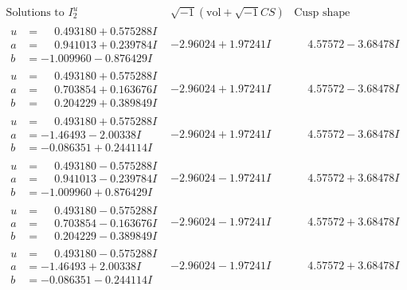 \documentclass[1p]{elsarticle_modified}
\theoremstyle{definition}
\newcommand{\I}{\sqrt{-1}}
\begin{document}
$$\begin{array}{c|c|c}  
\text{Solutions to }I^u_{2}& \I (\text{vol} + \sqrt{-1}CS) & \text{Cusp shape}\\
 \hline 
\begin{aligned}
u &= \phantom{-}0.493180 + 0.575288 I \\
a &= \phantom{-}0.941013 + 0.239784 I \\
b &= -1.009960 - 0.876429 I\end{aligned}
 & -2.96024 + 1.97241 I & \phantom{-}4.57572 - 3.68478 I \\ \hline\begin{aligned}
u &= \phantom{-}0.493180 + 0.575288 I \\
a &= \phantom{-}0.703854 + 0.163676 I \\
b &= \phantom{-}0.204229 + 0.389849 I\end{aligned}
 & -2.96024 + 1.97241 I & \phantom{-}4.57572 - 3.68478 I \\ \hline\begin{aligned}
u &= \phantom{-}0.493180 + 0.575288 I \\
a &= -1.46493 - 2.00338 I \\
b &= -0.086351 + 0.244114 I\end{aligned}
 & -2.96024 + 1.97241 I & \phantom{-}4.57572 - 3.68478 I \\ \hline\begin{aligned}
u &= \phantom{-}0.493180 - 0.575288 I \\
a &= \phantom{-}0.941013 - 0.239784 I \\
b &= -1.009960 + 0.876429 I\end{aligned}
 & -2.96024 - 1.97241 I & \phantom{-}4.57572 + 3.68478 I \\ \hline\begin{aligned}
u &= \phantom{-}0.493180 - 0.575288 I \\
a &= \phantom{-}0.703854 - 0.163676 I \\
b &= \phantom{-}0.204229 - 0.389849 I\end{aligned}
 & -2.96024 - 1.97241 I & \phantom{-}4.57572 + 3.68478 I \\ \hline\begin{aligned}
u &= \phantom{-}0.493180 - 0.575288 I \\
a &= -1.46493 + 2.00338 I \\
b &= -0.086351 - 0.244114 I\end{aligned}
 & -2.96024 - 1.97241 I & \phantom{-}4.57572 + 3.68478 I \\ \hline\begin{aligned}

\end{aligned}
\end{array}$$
\end{document}

